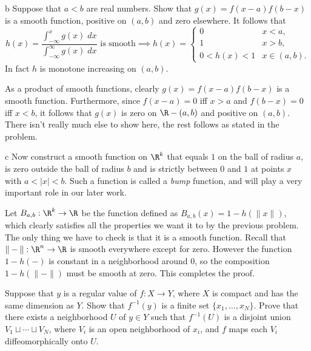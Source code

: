\documentclass[11pt,letterpaper]{article}
\begin{document}
\begin{solution}
    \begin{partproblem}{b}
        Suppose that $a < b$ are real numbers. Show that $g(x)=f(x-a)f(b-x)$ is a smooth function, positive on $(a,b)$ and zero elsewhere. It follows that
        \[
            h(x)=\frac{\int^x_{-\infty} g(x)\;dx}{\int^\infty_{-\infty}g(x)\;dx} \text{ is smooth}\implies h(x)=\begin{cases}
                0 & x < a,\\
                1 & x> b,\\
                0 < h(x)<1 & x\in (a,b).
            \end{cases}
        \]  
        In fact $h$ is monotone increasing on $(a,b)$.
    \end{partproblem}

    \quad As a product of smooth functions, clearly $g(x)=f(x-a)f(b-x)$ is a smooth function. Furthermore, since $f(x-a)=0$ iff $x>a$ and $f(b-x)=0$ iff $x<b$, it follows that $g(x)$ is zero on $\R-(a,b)$ and positive on $(a,b)$. There isn't really much else to show here, the rest follows as stated in the problem.   

    \begin{partproblem}{c}
        Now construct a smooth function on $\R^k$ that equals $1$ on the ball of radius $a$, is zero outside the ball of radius $b$ and is strictly between $0$ and $1$ at points $x$ with $a < |x| < b$. Such a function is called a \emph{bump} function, and will play a very important role in our later work.
    \end{partproblem}

    \quad Let $B_{a,b} : \R^k \to \R$ be the function defined as $B_{a,b}(x)=1-h(\|x\|)$, which clearly satisfies all the properties we want it to by the previous problem. The only thing we have to check is that it is a smooth function. Recall that $\|-\| : \R^n \to \R$ is smooth everywhere except for zero. However the function $1-h(-)$ is constant in a neighborhood around $0$, so the composition $1-h(\|-\|)$ must be smooth at zero. This completes the proof.   
\end{solution}

\begin{problem} Suppose that $y$ is a regular value of $f : X \to Y$, where $X$ is compact and has the same dimension as $Y$. Show that $f^{-1}(y)$ is a finite set $\{x_1,\ldots,x_N\}$. Prove that there exists a neighborhood $U$ of $y\in Y$ such that $f^{-1}(U)$ is a disjoint union $V_1\sqcup \cdots \sqcup V_N$, where $V_i$ is an open neighborhood of $x_i$, and $f$ maps each $V_i$ diffeomorphically onto $U$. %
\end{problem}
\end{document}
